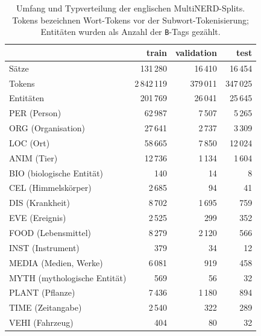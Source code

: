\begin{table}[ht]
    \centering
    \small
    \caption[Umfang und Typverteilung der englischen MultiNERD-Splits]{Umfang und Typverteilung der englischen MultiNERD-Splits.
    Tokens bezeichnen Wort-Tokens vor der Subwort-Tokenisierung;
    Entitäten wurden als Anzahl der \texttt{B}-Tags gezählt.}
    \label{tab:datensplits}
    \begin{tabular}{lrrr}
        \toprule
                                & \textbf{train} & \textbf{validation} & \textbf{test} \\
        \midrule
        Sätze                   & 131\,280    & 16\,410  & 16\,454 \\
        Tokens                  & 2\,842\,119 & 379\,011 & 347\,025 \\
        Entitäten               & 201\,769    & 26\,041  & 25\,645 \\
        \midrule
        PER (Person)            & 62\,987 & 7\,507 & 5\,265 \\
        ORG (Organisation)      & 27\,641 & 2\,737 & 3\,309 \\
        LOC (Ort)               & 58\,665 & 7\,850 & 12\,024 \\
        ANIM (Tier)             & 12\,736 & 1\,134 & 1\,604 \\
        BIO (biologische Entität) & 140   & 14     & 8 \\
        CEL (Himmelskörper)     & 2\,685  & 94     & 41 \\
        DIS (Krankheit)         & 8\,702  & 1\,695 & 759 \\
        EVE (Ereignis)          & 2\,525  & 299    & 352 \\
        FOOD (Lebensmittel)     & 8\,279  & 2\,120 & 566 \\
        INST (Instrument)       & 379     & 34     & 12 \\
        MEDIA (Medien, Werke)   & 6\,081  & 919    & 458 \\
        MYTH (mythologische Entität) & 569 & 56    & 32 \\
        PLANT (Pflanze)         & 7\,436  & 1\,180 & 894 \\
        TIME (Zeitangabe)       & 2\,540  & 322    & 289 \\
        VEHI (Fahrzeug)         & 404     & 80     & 32 \\
        \bottomrule
    \end{tabular}
\end{table}

